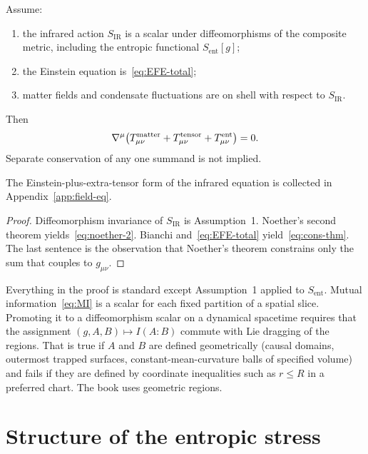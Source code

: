 \begin{theorem}
  \label{thm:conservation}
  Assume:
  \begin{enumerate}
    \item the infrared action \(S_{\mathrm{IR}}\) is a scalar under
          diffeomorphisms of the composite metric, including the
          entropic functional \(S_{\mathrm{ent}}[g]\);
    \item the Einstein equation is~\eqref{eq:EFE-total};
    \item matter fields and condensate fluctuations are on shell
          with respect to \(S_{\mathrm{IR}}\).
  \end{enumerate}
  Then
  \begin{equation}
    \label{eq:cons-thm}
    \nabla^\mu
    \bigl(
      T_{\mu\nu}^{\mathrm{matter}}
      +T_{\mu\nu}^{\mathrm{tensor}}
      +T^{\mathrm{ent}}_{\mu\nu}
    \bigr)
    =0.
  \end{equation}
  Separate conservation of any one summand is not implied.
\end{theorem}

The Einstein-plus-extra-tensor form of the infrared equation
is collected in Appendix~\ref{app:field-eq}.

\begin{proof}
  Diffeomorphism invariance of \(S_{\mathrm{IR}}\) is
  Assumption~1. Noether's second theorem yields~\eqref{eq:noether-2}.
  Bianchi and~\eqref{eq:EFE-total} yield~\eqref{eq:cons-thm}. The
  last sentence is the observation that Noether's theorem constrains
  only the sum that couples to \(g_{\mu\nu}\).
\end{proof}

\begin{remark}
  Everything in the proof is standard except Assumption~1 applied
  to \(S_{\mathrm{ent}}\). Mutual information~\eqref{eq:MI} is a
  scalar for each fixed partition of a spatial slice. Promoting it
  to a diffeomorphism scalar on a dynamical spacetime requires that
  the assignment
  \((g,A,B)\mapsto I(A:B)\) commute with Lie dragging of the
  regions. That is true if \(A\) and \(B\) are defined
  geometrically (causal domains, outermost trapped surfaces,
  constant-mean-curvature balls of specified volume) and fails if
  they are defined by coordinate inequalities such as
  \(r\le R\) in a preferred chart. The book uses geometric
  regions.
\end{remark}

\section{Structure of the entropic stress}
\label{sec:ch11-Tent}

